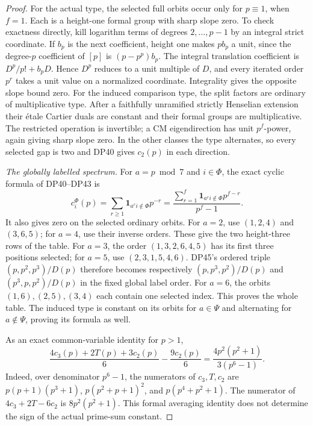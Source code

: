 \begin{proof}
For the actual type, the selected full orbits occur only for $p\equiv1$, when $f=1$. Each is a height-one formal group with sharp slope zero. To check exactness directly, kill logarithm terms of degrees $2,\ldots,p-1$ by an integral strict coordinate. If $b_p$ is the next coefficient, height one makes $pb_p$ a unit, since the degree-$p$ coefficient of $[p]$ is $(p-p^p)b_p$.
The integral translation coefficient is $D^p/p!+b_pD$.
Hence $D^p$ reduces to a unit multiple of $D$, and every iterated order $p^r$ takes a unit value on a normalized coordinate. Integrality gives the opposite slope bound zero.
For the induced comparison type, the split factors are ordinary of multiplicative type. After a faithfully unramified strictly Henselian extension their \'etale Cartier duals are constant and their formal groups are multiplicative. The restricted operation is invertible; a CM eigendirection has unit $p^f$-power, again giving sharp slope zero. In the other classes the type alternates, so every selected gap is two and DP40 gives $c_2(p)$ in each direction.

\emph{The globally labelled spectrum.}
For $a=p\bmod7$ and $i\in\Phi$, the exact cyclic formula of DP40--DP43 is
\begin{equation}\label{eq:cmprimecycle}
 c_i^\Phi(p)
 =\sum_{r\ge1}\mathbf1_{a^ri\notin\Phi}p^{-r}
 =\frac{\sum_{r=1}^f\mathbf1_{a^ri\notin\Phi}p^{f-r}}{p^f-1}.
\end{equation}
It also gives zero on the selected ordinary orbits.
For $a=2$, use $(1,2,4)$ and $(3,6,5)$; for $a=4$, use their inverse orders. These give the two height-three rows of the table.
For $a=3$, the order $(1,3,2,6,4,5)$ has its first three positions selected; for $a=5$, use $(2,3,1,5,4,6)$. DP45's ordered triple $(p,p^2,p^3)/D(p)$ therefore becomes respectively $(p,p^3,p^2)/D(p)$ and $(p^3,p,p^2)/D(p)$ in the fixed global label order.
For $a=6$, the orbits $(1,6),(2,5),(3,4)$ each contain one selected index. This proves the whole table. The induced type is constant on its orbits for $a\in\Psi$ and alternating for $a\notin\Psi$, proving its formula as well.

As an exact common-variable identity for $p>1$,
\begin{equation}\label{eq:cmprimeformalaverage}
 \frac{4c_3(p)+2T(p)+3c_2(p)}6-\frac{9c_2(p)}6
       =\frac{4p^2(p^2+1)}{3(p^6-1)}.
\end{equation}
Indeed, over denominator $p^6-1$, the numerators of $c_3,T,c_2$ are
$p(p+1)(p^3+1)$, $p(p^2+p+1)^2$, and $p(p^4+p^2+1)$.
The numerator of $4c_3+2T-6c_2$ is $8p^2(p^2+1)$.
This formal averaging identity does not determine the sign of the actual prime-sum constant.


\end{proof}

